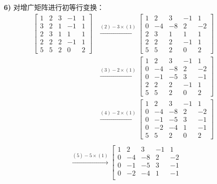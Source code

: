 \begin{problem}
\begin{solution}
\begin{enumerate}
			\item[\textbf{6)}] 对增广矩阵进行初等行变换：
			$$
			\begin{aligned}
				\left[\begin{array}{cccc|c}
					1 & 2 & 3 & -1 & 1 \\
					3 & 2 & 1 & -1 & 1 \\
					2 & 3 & 1 & 1 & 1 \\
					2 & 2 & 2 & -1 & 1 \\
					5 & 5 & 2 & 0 & 2
				\end{array}\right]
				& \xrightarrow{(2) - 3 \times (1)} \left[\begin{array}{cccc|c}
					1 & 2 & 3 & -1 & 1 \\
					0 & -4 & -8 & 2 & -2 \\
					2 & 3 & 1 & 1 & 1 \\
					2 & 2 & 2 & -1 & 1 \\
					5 & 5 & 2 & 0 & 2
				\end{array}\right] \\
				& \xrightarrow{(3) - 2 \times (1)} \left[\begin{array}{cccc|c}
					1 & 2 & 3 & -1 & 1 \\
					0 & -4 & -8 & 2 & -2 \\
					0 & -1 & -5 & 3 & -1 \\
					2 & 2 & 2 & -1 & 1 \\
					5 & 5 & 2 & 0 & 2
				\end{array}\right] \\
				& \xrightarrow{(4) - 2 \times (1)} \left[\begin{array}{cccc|c}
					1 & 2 & 3 & -1 & 1 \\
					0 & -4 & -8 & 2 & -2 \\
					0 & -1 & -5 & 3 & -1 \\
					0 & -2 & -4 & 1 & -1 \\
					5 & 5 & 2 & 0 & 2
				\end{array}\right] \\
			\end{aligned}
			$$
			$$
			\begin{aligned}
				& \xrightarrow{(5) - 5 \times (1)} \left[\begin{array}{cccc|c}
					1 & 2 & 3 & -1 & 1 \\
					0 & -4 & -8 & 2 & -2 \\
					0 & -1 & -5 & 3 & -1 \\
					0 & -2 & -4 & 1 & -1 \\

\end{array}
\end{aligned}$$
\end{enumerate}
\end{solution}
\end{problem}
